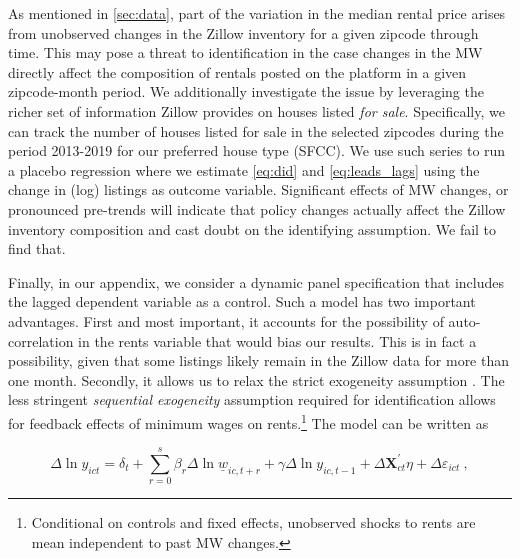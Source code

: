 
As mentioned in \autoref{sec:data}, part of the variation in the median rental price arises 
from unobserved changes in the Zillow inventory for a given zipcode through time. This may 
pose a threat to identification in the case changes in the MW directly affect the composition 
of rentals posted on the platform in a given zipcode-month period. We 
additionally investigate the issue by leveraging the richer set of information Zillow provides 
on houses listed \textit{for sale}. Specifically, we can track the number of houses listed for 
sale in the selected zipcodes during the period 2013-2019 for our preferred house type (SFCC). 
We use such series to run a placebo regression where we estimate \autoref{eq:did} and 
\autoref{eq:leads_lags} using the change in (log) listings as outcome variable. Significant 
effects of MW changes, or pronounced pre-trends will indicate that policy changes actually 
affect the Zillow inventory composition and cast doubt on the identifying assumption. 
We fail to find that.

Finally, in our appendix, we consider a dynamic panel specification that includes the lagged
dependent variable as a control. Such a model has two important advantages. First and most 
important, it accounts for the possibility of auto-correlation in the rents variable that 
would bias our results. This is in fact a possibility, given that some listings likely remain 
in the Zillow data for more than one month. Secondly, it allows us to relax the strict 
exogeneity assumption \parencite{ArellanoHonore2001}. The less stringent \textit{sequential 
exogeneity} assumption required for identification allows for feedback effects of minimum wages 
on rents.\footnote{Conditional on controls and fixed effects, unobserved shocks to rents are mean independent to past MW changes.} The model can be written as

\begin{equation}\label{eq:ab_panel}
	\Delta \ln y_{ict} = \delta_t
						+ \sum_{r=0}^{s} \beta_r \Delta \ln \underline{w}_{ic,t+r}
						+ \gamma \Delta \ln y_{ic,t-1} + \Delta \mathbf{X}^{'}_{ct}\eta
						+ \Delta \varepsilon_{ict} \ ,
\end{equation}

